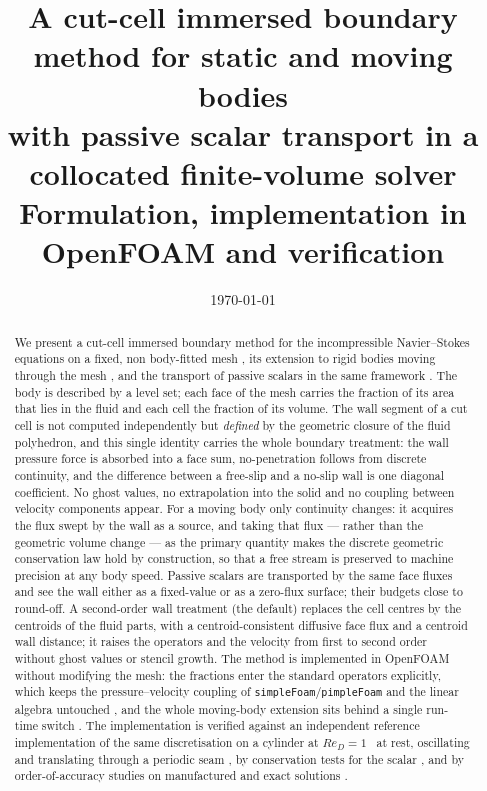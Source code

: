 \documentclass[11pt,a4paper]{article}
\title{\bf A cut-cell immersed boundary method for static and moving bodies\\
with passive scalar transport in a collocated finite-volume solver\\[3pt]
\large Formulation, implementation in OpenFOAM and verification}
\author{}
\date{\today}
\theoremstyle{remark}
\newcommand{\code}[1]{\texttt{#1}}
\begin{document}
\maketitle

\begin{abstract}
We present a cut-cell immersed boundary method for the incompressible Navier--Stokes
equations on a fixed, non body-fitted mesh%
, its extension to rigid bodies moving through the mesh%
, and the transport of passive scalars in the same framework%
. The body is described by a level set; each face of the mesh carries the fraction of its
area that lies in the fluid and each cell the fraction of its volume. The wall segment of a
cut cell is not computed independently but \emph{defined} by the geometric closure of the
fluid polyhedron, and this single identity carries the whole boundary treatment: the wall
pressure force is absorbed into a face sum, no-penetration follows from discrete continuity,
and the difference between a free-slip and a no-slip wall is one diagonal coefficient. No
ghost values, no extrapolation into the solid and no coupling between velocity components
appear.
For a moving body only continuity changes: it acquires the flux swept by the wall as a
source, and taking that flux --- rather than the geometric volume change --- as the primary
quantity makes the discrete geometric conservation law hold by construction, so that a free
stream is preserved to machine precision at any body speed.
Passive scalars are transported by the same face fluxes and see the wall either as a
fixed-value or as a zero-flux surface; their budgets close to round-off.
A second-order wall treatment (the default) replaces the cell centres by the centroids of the
fluid parts, with a centroid-consistent diffusive face flux and a centroid wall distance; it
raises the operators and the velocity from first to second order without ghost values or
stencil growth.
The method is implemented in OpenFOAM without modifying the mesh: the fractions enter the
standard operators explicitly, which keeps the pressure--velocity coupling of
\code{simpleFoam}/\code{pimpleFoam} and the linear algebra untouched%
, and the whole moving-body extension sits behind a single run-time switch%
. The implementation is verified against an independent reference implementation of the
same discretisation on a cylinder at $Re_D=1$%
\ at rest, oscillating and translating through a periodic seam%
, by conservation tests for the scalar%
, and by order-of-accuracy studies on manufactured and exact solutions%
.
\end{abstract}
\end{document}
